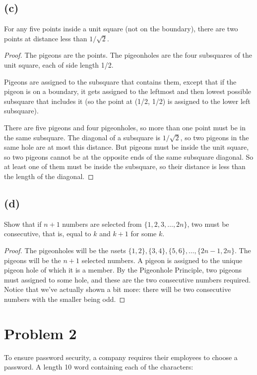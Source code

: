 \documentclass[14pt]{extarticle}
\begin{document}
\subsection{(c)}
For any five points inside a unit square (not on the boundary), there are two points at distance less than $1/\sqrt{2}$.
\begin{proof}
The pigeons are the points. The pigeonholes are the four subsquares of the unit square, each of side length 1/2.

Pigeons are assigned to the subsquare that contains them, except that if the pigeon is on a bound­ary, it gets assigned to the leftmost and then lowest possible subsquare that includes it (so the point at (1/2, 1/2) is assigned to the lower left subsquare).

There are five pigeons and four pigeonholes, so more than one point must be in the same subsquare. The diagonal of a subsquare is $1/\sqrt{2}$, so two pigeons in the same hole are at most this distance. But pigeons must be inside the unit square, so two pigeons cannot be at the opposite ends of the same subsquare diagonal. So at least one of them must be inside the subsquare, so their distance is less than the length of the diagonal.
\end{proof}

\subsection{(d)}
Show that if $n + 1$ numbers are selected from $\{1, 2, 3, \ldots , 2n\}$, two must be consecutive, that is, equal to $k$ and $k + 1$ for some $k$.
\begin{proof}
The pigeonholes will be the $n $sets $\{1, 2\} , \{3, 4\} , \{5, 6\} , \ldots , \{2n - 1, 2n\}$. The pigeons will be the $n + 1$ selected numbers. A pigeon is assigned to the unique pigeon hole of which it is a member. By the Pigeonhole Principle, two pigeons must assigned to some hole, and these are the two consecutive numbers required. Notice that we’ve actually shown a bit more: there will be two consecutive numbers with the smaller being odd.
\end{proof}

\section{Problem 2}
To ensure password security, a company requires their employees to choose a password. A length 10 word containing each of the characters:
\end{document}
